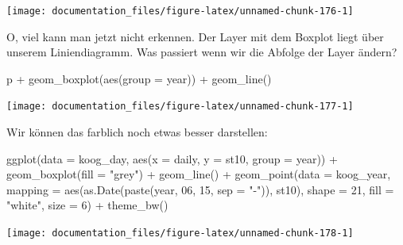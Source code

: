 \documentclass[
]{article}
\newenvironment{Shaded}{\begin{snugshade}}{\end{snugshade}}
\newcommand{\AttributeTok}[1]{\textcolor[rgb]{0.77,0.63,0.00}{#1}}
\newcommand{\DecValTok}[1]{\textcolor[rgb]{0.00,0.00,0.81}{#1}}
\newcommand{\FunctionTok}[1]{\textcolor[rgb]{0.00,0.00,0.00}{#1}}
\newcommand{\NormalTok}[1]{#1}
\newcommand{\SpecialCharTok}[1]{\textcolor[rgb]{0.00,0.00,0.00}{#1}}
\newcommand{\StringTok}[1]{\textcolor[rgb]{0.31,0.60,0.02}{#1}}
\begin{document}
\begin{center}\texttt{[image: documentation\_files/figure-latex/unnamed-chunk-176-1]} \end{center}

O, viel kann man jetzt nicht erkennen. Der Layer mit dem Boxplot liegt über unserem Liniendiagramm. Was passiert wenn wir die Abfolge der Layer ändern?

\begin{Shaded}
\begin{Highlighting}[]
\NormalTok{p }\SpecialCharTok{+} \FunctionTok{geom\_boxplot}\NormalTok{(}\FunctionTok{aes}\NormalTok{(}\AttributeTok{group =}\NormalTok{ year)) }\SpecialCharTok{+} \FunctionTok{geom\_line}\NormalTok{()}
\end{Highlighting}
\end{Shaded}

\begin{center}\texttt{[image: documentation\_files/figure-latex/unnamed-chunk-177-1]} \end{center}

Wir können das farblich noch etwas besser darstellen:

\begin{Shaded}
\begin{Highlighting}[]
\FunctionTok{ggplot}\NormalTok{(}\AttributeTok{data =}\NormalTok{ koog\_day, }\FunctionTok{aes}\NormalTok{(}\AttributeTok{x =}\NormalTok{ daily, }\AttributeTok{y =}\NormalTok{ st10, }\AttributeTok{group =}\NormalTok{ year)) }\SpecialCharTok{+}
  \FunctionTok{geom\_boxplot}\NormalTok{(}\AttributeTok{fill =} \StringTok{"grey"}\NormalTok{) }\SpecialCharTok{+}
  \FunctionTok{geom\_line}\NormalTok{() }\SpecialCharTok{+}
    \FunctionTok{geom\_point}\NormalTok{(}\AttributeTok{data =}\NormalTok{ koog\_year, }\AttributeTok{mapping =} \FunctionTok{aes}\NormalTok{(}\FunctionTok{as.Date}\NormalTok{(}\FunctionTok{paste}\NormalTok{(year, }\DecValTok{06}\NormalTok{, }\DecValTok{15}\NormalTok{, }\AttributeTok{sep =} \StringTok{"{-}"}\NormalTok{)), st10), }\AttributeTok{shape =} \DecValTok{21}\NormalTok{, }\AttributeTok{fill =} \StringTok{"white"}\NormalTok{, }\AttributeTok{size =} \DecValTok{6}\NormalTok{) }\SpecialCharTok{+}
  \FunctionTok{theme\_bw}\NormalTok{()}
\end{Highlighting}
\end{Shaded}

\begin{center}\texttt{[image: documentation\_files/figure-latex/unnamed-chunk-178-1]} \end{center}
\end{document}
